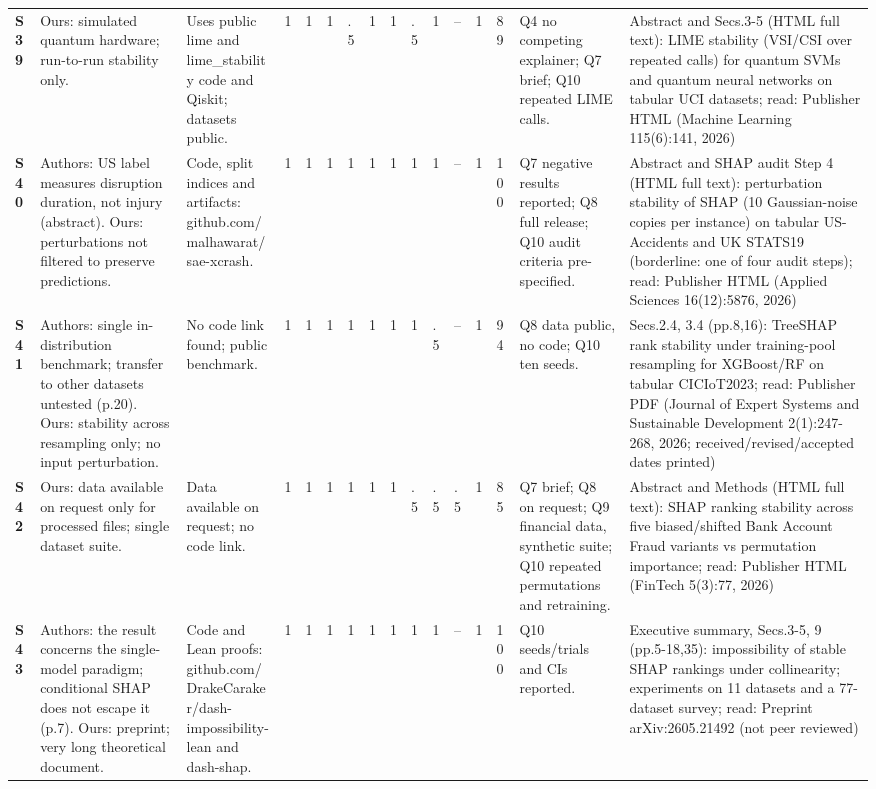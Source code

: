 \begin{longtable}{@{}P{1.0cm}P{4.6cm}P{3.6cm}P{0.3cm}P{0.3cm}P{0.3cm}P{0.3cm}P{0.3cm}P{0.3cm}P{0.3cm}P{0.3cm}P{0.3cm}P{0.36cm}P{0.75cm}P{3.0cm}P{3.9cm}@{}}
\textbf{S39} & Ours: simulated quantum hardware; run-to-run stability only. & Uses public lime and lime\_\allowbreak{}stability code and Qiskit; datasets public. & 1 & 1 & 1 & .5 & 1 & 1 & .5 & 1 & -- & 1 & 89 & Q4 no competing explainer; Q7 brief; Q10 repeated LIME calls. & Abstract and Secs.3-5 (HTML full text): LIME stability (VSI/\allowbreak{}CSI over repeated calls) for quantum SVMs and quantum neural networks on tabular UCI datasets; read: Publisher HTML (Machine Learning 115(6):141, 2026) \\
\textbf{S40} & Authors: US label measures disruption duration, not injury (abstract). Ours: perturbations not filtered to preserve predictions. & Code, split indices and artifacts: github.com/\allowbreak{}malhawarat/\allowbreak{}sae-xcrash. & 1 & 1 & 1 & 1 & 1 & 1 & 1 & 1 & -- & 1 & 100 & Q7 negative results reported; Q8 full release; Q10 audit criteria pre-specified. & Abstract and SHAP audit Step 4 (HTML full text): perturbation stability of SHAP (10 Gaussian-noise copies per instance) on tabular US-Accidents and UK STATS19 (borderline: one of four audit steps); read: Publisher HTML (Applied Sciences 16(12):5876, 2026) \\
\textbf{S41} & Authors: single in-distribution benchmark; transfer to other datasets untested (p.20). Ours: stability across resampling only; no input perturbation. & No code link found; public benchmark. & 1 & 1 & 1 & 1 & 1 & 1 & 1 & .5 & -- & 1 & 94 & Q8 data public, no code; Q10 ten seeds. & Secs.2.4, 3.4 (pp.8,16): TreeSHAP rank stability under training-pool resampling for XGBoost/\allowbreak{}RF on tabular CICIoT2023; read: Publisher PDF (Journal of Expert Systems and Sustainable Development 2(1):247-268, 2026; received/\allowbreak{}revised/\allowbreak{}accepted dates printed) \\
\textbf{S42} & Ours: data available on request only for processed files; single dataset suite. & Data available on request; no code link. & 1 & 1 & 1 & 1 & 1 & 1 & .5 & .5 & .5 & 1 & 85 & Q7 brief; Q8 on request; Q9 financial data, synthetic suite; Q10 repeated permutations and retraining. & Abstract and Methods (HTML full text): SHAP ranking stability across five biased/\allowbreak{}shifted Bank Account Fraud variants vs permutation importance; read: Publisher HTML (FinTech 5(3):77, 2026) \\
\textbf{S43} & Authors: the result concerns the single-model paradigm; conditional SHAP does not escape it (p.7). Ours: preprint; very long theoretical document. & Code and Lean proofs: github.com/\allowbreak{}DrakeCaraker/\allowbreak{}dash-impossibility-lean and dash-shap. & 1 & 1 & 1 & 1 & 1 & 1 & 1 & 1 & -- & 1 & 100 & Q10 seeds/\allowbreak{}trials and CIs reported. & Executive summary, Secs.3-5, 9 (pp.5-18,35): impossibility of stable SHAP rankings under collinearity; experiments on 11 datasets and a 77-dataset survey; read: Preprint arXiv:2605.21492 (not peer reviewed) \\

\end{longtable}
